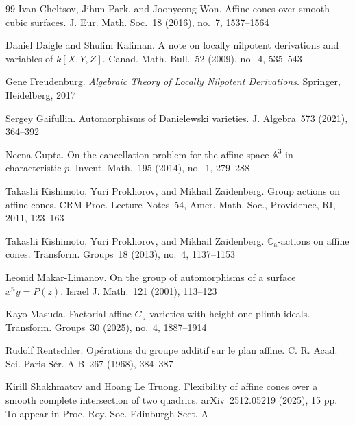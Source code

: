 \documentclass[a4paper, 12pt, reqno]{amsart}
\newcommand{\bb}{\mathbb}
\theoremstyle{definition}
\theoremstyle{plain}
\begin{document}

\begin{thebibliography}{99}
Ivan Cheltsov, Jihun Park, and Joonyeong Won. Affine cones over smooth cubic surfaces. J. Eur. Math. Soc.~18 (2016), no.~7, 1537--1564


Daniel Daigle and Shulim Kaliman. A note on locally nilpotent derivations and variables of $k[X, Y, Z]$. Canad. Math. Bull.~52 (2009), no.~4, 535--543


Gene Freudenburg. \emph{Algebraic Theory of Locally Nilpotent Derivations}. Springer, Heidelberg, 2017


Sergey Gaifullin. Automorphisms of Danielewski varieties. J. Algebra~573 (2021), 364--392


Neena Gupta. On the cancellation problem for the affine space $\bb{A}^3$ in characteristic $p$. Invent. Math.~195 (2014), no.~1, 279--288


Takashi Kishimoto, Yuri Prokhorov, and Mikhail Zaidenberg. Group actions on affine cones. CRM Proc. Lecture Notes~54, Amer. Math. Soc., Providence, RI, 2011, 123--163


Takashi Kishimoto, Yuri Prokhorov, and Mikhail Zaidenberg. $\mathbb{G}_\mathrm{a}$-actions on affine cones. Transform. Groups~18 (2013), no.~4, 1137--1153


Leonid Makar-Limanov. On the group of automorphisms of a surface $x^n y = P(z)$. Israel J. Math.~121 (2001), 113--123


Kayo Masuda. Factorial affine $G_a$-varieties with height one plinth ideals. Transform. Groups~30 (2025), no.~4, 1887--1914


Rudolf Rentschler. Op{\'e}rations du groupe additif sur le plan affine. C. R. Acad. Sci. Paris S{\'e}r. A-B~267 (1968), 384--387


Kirill Shakhmatov and Hoang Le Truong. Flexibility of affine cones over a smooth complete intersection of two quadrics. arXiv~2512.05219 (2025), 15 pp. To appear in Proc. Roy. Soc. Edinburgh Sect. A
\end{thebibliography}{}

\end{document}
